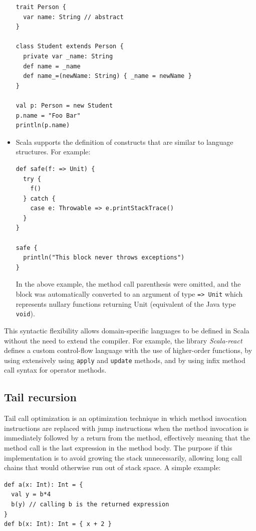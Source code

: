 \begin{itemize}
\begin{lstlisting}
trait Person {
  var name: String // abstract
}

class Student extends Person {
  private var _name: String
  def name = _name
  def name_=(newName: String) { _name = newName }
}

val p: Person = new Student
p.name = "Foo Bar"
println(p.name)
\end{lstlisting}

\item Scala supports the definition of constructs that are similar to language structures. For example:
\begin{lstlisting}
def safe(f: => Unit) {
  try {
    f()
  } catch {
    case e: Throwable => e.printStackTrace()
  }
}

safe {
  println("This block never throws exceptions")
}
\end{lstlisting}

In the above example, the method call parenthesis were omitted, and the block was automatically converted to an argument of type \texttt{=> Unit} which represents nullary functions returning Unit (equivalent of the Java type \texttt{void}).

\end{itemize}

This syntactic flexibility allows domain-specific languages to be defined in Scala without the need to extend the compiler. For example, the library \emph{Scala-react} defines a custom control-flow language with the use of higher-order functions, by using extensively using \texttt{apply} and \texttt{update} methods, and by using infix method call syntax for operator methods.

\subsection{Tail recursion}

Tail call optimization is an optimization technique in which method invocation instructions are replaced with jump instructions when the method invocation is immediately followed by a return from the method, effectively meaning that the method call is the last expression in the method body. The purpose if this implementation is to avoid growing the stack unnecessarily, allowing long call chains that would otherwise run out of stack space. A simple example:

\begin{lstlisting}
def a(x: Int): Int = { 
  val y = b*4
  b(y) // calling b is the returned expression 
} 
def b(x: Int): Int = { x + 2 }
\end{lstlisting} 

